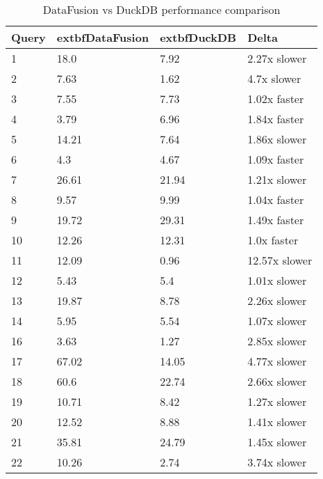 \begin{table}[h]
\centering
\begin{tabular}{|l|l|l|l|}
\hline
Query & 	extbf{DataFusion} & 	extbf{DuckDB} & Delta \\
\hline
1 & 18.0 & 7.92 & 2.27x slower \\
\hline
2 & 7.63 & 1.62 & 4.7x slower \\
\hline
3 & 7.55 & 7.73 & 1.02x faster \\
\hline
4 & 3.79 & 6.96 & 1.84x faster \\
\hline
5 & 14.21 & 7.64 & 1.86x slower \\
\hline
6 & 4.3 & 4.67 & 1.09x faster \\
\hline
7 & 26.61 & 21.94 & 1.21x slower \\
\hline
8 & 9.57 & 9.99 & 1.04x faster \\
\hline
9 & 19.72 & 29.31 & 1.49x faster \\
\hline
10 & 12.26 & 12.31 & 1.0x faster \\
\hline
11 & 12.09 & 0.96 & 12.57x slower \\
\hline
12 & 5.43 & 5.4 & 1.01x slower \\
\hline
13 & 19.87 & 8.78 & 2.26x slower \\
\hline
14 & 5.95 & 5.54 & 1.07x slower \\
\hline
16 & 3.63 & 1.27 & 2.85x slower \\
\hline
17 & 67.02 & 14.05 & 4.77x slower \\
\hline
18 & 60.6 & 22.74 & 2.66x slower \\
\hline
19 & 10.71 & 8.42 & 1.27x slower \\
\hline
20 & 12.52 & 8.88 & 1.41x slower \\
\hline
21 & 35.81 & 24.79 & 1.45x slower \\
\hline
22 & 10.26 & 2.74 & 3.74x slower \\
\hline
\end{tabular}
\caption{DataFusion vs DuckDB performance comparison}
\label{table:1}
\end{table}